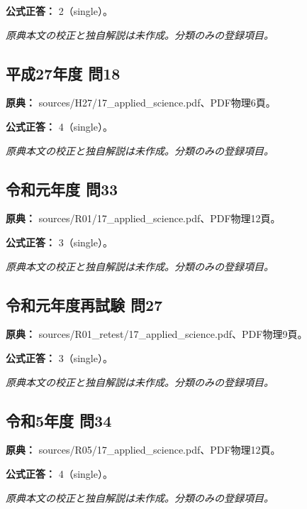\textbf{公式正答：} 2（single）。

\par\textit{原典本文の校正と独自解説は未作成。分類のみの登録項目。}

\subsection{平成27年度 問18}
\label{q:h27-reg-applied-18}

\noindent\textbf{原典：} sources/H27/17\_applied\_science.pdf、PDF物理6頁。

\textbf{公式正答：} 4（single）。

\par\textit{原典本文の校正と独自解説は未作成。分類のみの登録項目。}

\subsection{令和元年度 問33}
\label{q:r01-reg-applied-33}

\noindent\textbf{原典：} sources/R01/17\_applied\_science.pdf、PDF物理12頁。

\textbf{公式正答：} 3（single）。

\par\textit{原典本文の校正と独自解説は未作成。分類のみの登録項目。}

\subsection{令和元年度再試験 問27}
\label{q:r01-ret-applied-27}

\noindent\textbf{原典：} sources/R01\_retest/17\_applied\_science.pdf、PDF物理9頁。

\textbf{公式正答：} 3（single）。

\par\textit{原典本文の校正と独自解説は未作成。分類のみの登録項目。}

\subsection{令和5年度 問34}
\label{q:r05-reg-applied-34}

\noindent\textbf{原典：} sources/R05/17\_applied\_science.pdf、PDF物理12頁。

\textbf{公式正答：} 4（single）。

\par\textit{原典本文の校正と独自解説は未作成。分類のみの登録項目。}

